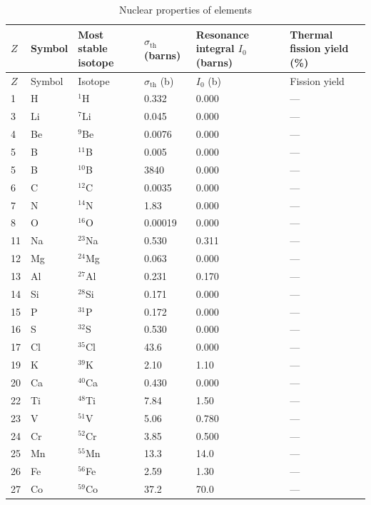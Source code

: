 \documentclass[12pt,a4paper]{article}
\begin{document}
	\begin{longtable}{p{0.8cm}p{1.2cm}p{2.0cm}p{2.5cm}p{2.5cm}p{2.5cm}}
		\caption{Nuclear properties of elements} \label{tab:nuclear-properties-func} \\
		\toprule
		\(Z\) & Symbol & Most stable isotope & \(\sigma_{\text{th}}\) (barns) & Resonance integral \(I_0\) (barns) & Thermal fission yield (\%) \\
		\midrule
		\endfirsthead
		\toprule
		\(Z\) & Symbol & Isotope & \(\sigma_{\text{th}}\) (b) & \(I_0\) (b) & Fission yield \\
		\midrule
		\endhead
		1  & H  & \(^{1}\)H & 0.332 & 0.000 & --- \\
		3  & Li & \(^{7}\)Li & 0.045 & 0.000 & --- \\
		4  & Be & \(^{9}\)Be & 0.0076 & 0.000 & --- \\
		5  & B  & \(^{11}\)B & 0.005 & 0.000 & --- \\
		5  & B  & \(^{10}\)B & 3840 & 0.000 & --- \\
		6  & C  & \(^{12}\)C & 0.0035 & 0.000 & --- \\
		7  & N  & \(^{14}\)N & 1.83 & 0.000 & --- \\
		8  & O  & \(^{16}\)O & 0.00019 & 0.000 & --- \\
		11 & Na & \(^{23}\)Na & 0.530 & 0.311 & --- \\
		12 & Mg & \(^{24}\)Mg & 0.063 & 0.000 & --- \\
		13 & Al & \(^{27}\)Al & 0.231 & 0.170 & --- \\
		14 & Si & \(^{28}\)Si & 0.171 & 0.000 & --- \\
		15 & P  & \(^{31}\)P & 0.172 & 0.000 & --- \\
		16 & S  & \(^{32}\)S & 0.530 & 0.000 & --- \\
		17 & Cl & \(^{35}\)Cl & 43.6 & 0.000 & --- \\
		19 & K  & \(^{39}\)K & 2.10 & 1.10 & --- \\
		20 & Ca & \(^{40}\)Ca & 0.430 & 0.000 & --- \\
		22 & Ti & \(^{48}\)Ti & 7.84 & 1.50 & --- \\
		23 & V  & \(^{51}\)V & 5.06 & 0.780 & --- \\
		24 & Cr & \(^{52}\)Cr & 3.85 & 0.500 & --- \\
		25 & Mn & \(^{55}\)Mn & 13.3 & 14.0 & --- \\
		26 & Fe & \(^{56}\)Fe & 2.59 & 1.30 & --- \\
		27 & Co & \(^{59}\)Co & 37.2 & 70.0 & --- \\

\end{longtable}
\end{document}
